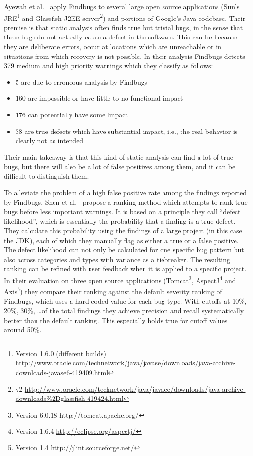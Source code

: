 Ayewah et al.~\cite{ayewah2007evaluating} apply Findbugs to several large open source applications
(Sun's JRE\footnote{Version 1.6.0 (different builds) \url{http://www.oracle.com/technetwork/java/javase/downloads/java-archive-downloads-javase6-419409.html}}
and Glassfish J2EE server\footnote{v2 \url{http://www.oracle.com/technetwork/java/javaee/downloads/java-archive-downloads\%2Dglassfish-419424.html}})
and portions of Google's Java codebase.
Their premise is that static analysis often finds true but trivial bugs, in the sense that these bugs do not actually cause a defect in the software.
This can be because they are deliberate errors, occur at locations which are unreachable or in situations from which recovery is not possible.
In their analysis Findbugs detects 379 medium and high priority warnings which they classify as follows:
\begin{itemize}
    \item 5 are due to erroneous analysis by Findbugs
    \item 160 are impossible or have little to no functional impact
    \item 176 can potentially have some impact
    \item 38 are true defects which have substantial impact, i.e., the real behavior is clearly not as intended
\end{itemize}
Their main takeaway is that this kind of static analysis can find a lot of true bugs, but there will also be a lot of false positives among them, and it can be difficult to distinguish them.

To alleviate the problem of a high false positive rate among the findings reported by Findbugs, Shen et al.~\cite{shen2011efindbugs} propose a ranking method which attempts to rank true bugs before less important warnings.
It is based on a principle they call ``defect likelihood'', which is essentially the probability that a finding is a true defect.
They calculate this probability using the findings of a large project (in this case the JDK), each of which they manually flag as either a true or a false positive.
The defect likelihood can not only be calculated for one specific bug pattern but also across categories and types with variance as a tiebreaker.
The resulting ranking can be refined with user feedback when it is applied to a specific project.
In their evaluation on three open source applications
(Tomcat\footnote{Version 6.0.18 \url{http://tomcat.apache.org/}}, AspectJ\footnote{Version 1.6.4 \url{http://eclipse.org/aspectj/}} and Axis\footnote{Version 1.4 \url{http://jlint.sourceforge.net/}})
they compare their ranking against the default severity ranking of Findbugs, which uses a hard-coded value for each bug type.
With cutoffs at 10\%, 20\%, 30\%, \ldots of the total findings they achieve precision and recall systematically better than the default ranking.
This especially holds true for cutoff values around 50\%.

